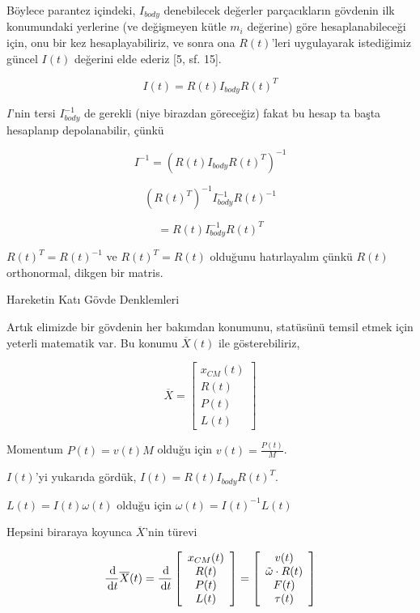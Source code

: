 \documentclass[12pt,fleqn]{article}\usepackage{../../common}
\begin{document}
Böylece parantez içindeki, $I_{body}$ denebilecek değerler parçacıkların
gövdenin ilk konumundaki yerlerine (ve değişmeyen kütle $m_i$ değerine) göre
hesaplanabileceği için, onu bir kez hesaplayabiliriz, ve sonra ona $R(t)$'leri
uygulayarak istediğimiz güncel $I(t)$ değerini elde ederiz [5, sf. 15].

$$
I(t) = R(t) I_{body} R(t)^T
$$

$I$'nin tersi $I_{body}^{-1}$ de gerekli (niye birazdan göreceğiz) fakat bu
hesap ta başta hesaplanıp depolanabilir, çünkü

$$
I^{-1} = ( R(t) I_{body} R(t)^T )^{-1} 
$$

$$
(R(t)^T)^{-1} I_{body}^{-1} R(t)^{-1} 
$$

$$
= R(t) I_{body}^{-1} R(t)^T
$$

$R(t)^T = R(t)^{-1}$ ve $R(t)^T = R(t)$ olduğunu hatırlayalım çünkü $R(t)$
orthonormal, dikgen bir matris. 

Hareketin Katı Gövde Denklemleri

Artık elimizde bir gövdenin her bakımdan konumunu, statüsünü temsil etmek için yeterli
matematik var. Bu konumu $\overline{X}(t)$ ile gösterebiliriz,

$$
\overline{X} = \left[\begin{array}{c}
x_{CM}(t) \\ R(t) \\ P(t) \\ L(t)
\end{array}\right]
$$

Momentum $P(t) = v(t) M$ olduğu için $v(t) = \frac{P(t)}{M}$.

$I(t)$'yi yukarıda gördük, $I(t) = R(t) I_{body} R(t)^T$.

$L(t) = I(t) \omega(t)$ olduğu için $\omega(t) = I(t)^{-1} L(t)$

Hepsini biraraya koyunca $\overline{X}$'nin türevi

$$
\frac{\,\mathrm{d}}{\,\mathrm{d} t} \overline{X}(t) =
\frac{\,\mathrm{d}}{\,\mathrm{d} t}
\left[\begin{array}{c}
x_{CM}(t) \\ R(t) \\ P(t) \\ L(t)
\end{array}\right]
=
\left[\begin{array}{c}
v(t) \\ \tilde \omega \cdot R(t) \\ F(t) \\ \tau(t)
\end{array}\right]
$$
\end{document}
